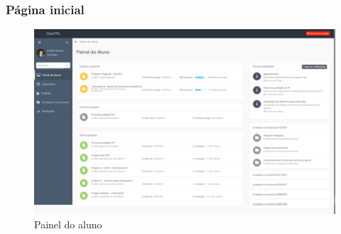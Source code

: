 \subsubsection{Página inicial}

\begin{figure}[H]
  \centering
  \includegraphics[width=1\textwidth,center]{images/implementacao/alunos/dashboard}
  \caption{Painel do aluno}
  \label{fig:student_dashboard}
\end{figure}

